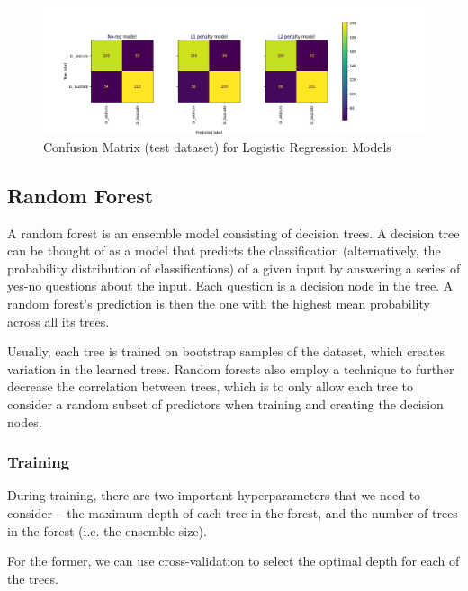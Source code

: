 \begin{figure}[!ht]
\begin{center}
\includegraphics[width=\textwidth]{fig/cm_logreg.png}
\end{center}
\caption{Confusion Matrix (test dataset) for Logistic Regression Models}
\label{logregcm}
\end{figure}

\newpage
\subsection{Random Forest}

A random forest is an ensemble model consisting of decision trees. A decision tree can be thought of as a model that predicts the classification (alternatively, the probability distribution of classifications) of a given input by answering a series of yes-no questions about the input. Each question is a decision node in the tree. A random forest's prediction is then the one with the highest mean probability across all its trees.

Usually, each tree is trained on bootstrap samples of the dataset, which creates variation in the learned trees. Random forests also employ a technique to further decrease the correlation between trees, which is to only allow each tree to consider a random subset of predictors when training and creating the decision nodes.

\subsubsection{Training}

During training, there are two important hyperparameters that we need to consider -- the maximum depth of each tree in the forest, and the number of trees in the forest (i.e. the ensemble size).

For the former, we can use cross-validation to select the optimal depth for each of the trees.

